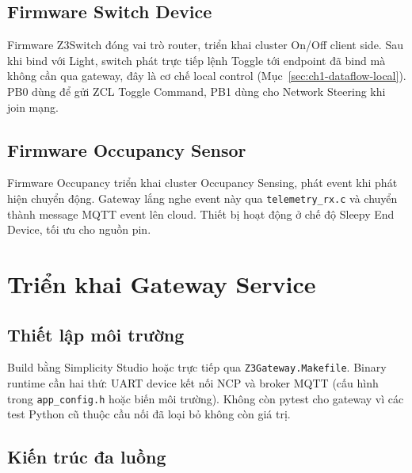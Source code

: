 \subsection{Firmware Switch Device}
\label{sec:ch3-switch-modules}

Firmware Z3Switch đóng vai trò router, triển khai cluster On/Off
client side. Sau khi bind với Light, switch phát trực tiếp lệnh
Toggle tới endpoint đã bind mà không cần qua gateway, đây là cơ
chế local control (Mục~\ref{sec:ch1-dataflow-local}). PB0 dùng để
gửi ZCL Toggle Command, PB1 dùng cho Network Steering khi join mạng.

\subsection{Firmware Occupancy Sensor}
\label{sec:ch3-occupancy-modules}

Firmware Occupancy triển khai cluster Occupancy Sensing, phát event
khi phát hiện chuyển động. Gateway lắng nghe event này qua
\texttt{telemetry\_rx.c} và chuyển thành message MQTT event lên cloud.
Thiết bị hoạt động ở chế độ Sleepy End Device, tối ưu cho nguồn pin.


\section{Triển khai Gateway Service}
\label{sec:ch3-gateway}

\subsection{Thiết lập môi trường}
\label{sec:ch3-setup}

Build bằng Simplicity Studio hoặc trực tiếp qua
\texttt{Z3Gateway.Makefile}. Binary runtime cần hai thứ: UART device
kết nối NCP và broker MQTT (cấu hình trong \texttt{app\_config.h}
hoặc biến môi trường). Không còn pytest cho gateway vì các test
Python cũ thuộc cầu nối đã loại bỏ không còn giá trị.

\subsection{Kiến trúc đa luồng}
\label{sec:ch3-threading}

